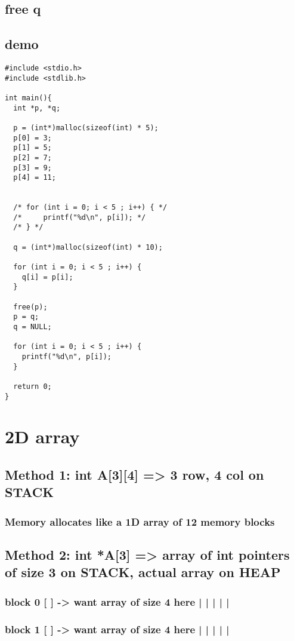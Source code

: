 \documentclass{article}
\begin{document}
\subsection{free q}
\label{sec:org4dbccab}
\subsection{demo}
\label{sec:org9976efd}
\begin{verbatim}
#include <stdio.h>
#include <stdlib.h>

int main(){
  int *p, *q;

  p = (int*)malloc(sizeof(int) * 5);
  p[0] = 3;
  p[1] = 5;
  p[2] = 7;
  p[3] = 9;
  p[4] = 11;


  /* for (int i = 0; i < 5 ; i++) { */
  /* 	 printf("%d\n", p[i]); */
  /* } */

  q = (int*)malloc(sizeof(int) * 10);

  for (int i = 0; i < 5 ; i++) {
    q[i] = p[i];
  }

  free(p);
  p = q;
  q = NULL;

  for (int i = 0; i < 5 ; i++) {
    printf("%d\n", p[i]);
  }

  return 0;
}

\end{verbatim}
\section{2D array}
\label{sec:org21454ca}
\subsection{Method 1: int A[3][4] => 3 row, 4 col on STACK}
\label{sec:orga17bfc5}
\subsubsection{Memory allocates like a 1D array of 12 memory blocks}
\label{sec:orgaba5ad2}
\subsection{Method 2: int *A[3] => array of int pointers of size 3 on STACK, actual array on HEAP}
\label{sec:org193f43b}
\subsubsection{block 0 [ ] -> want array of size 4 here | | | | |}
\label{sec:orga5e0cd8}
\subsubsection{block 1 [ ] -> want array of size 4 here | | | | |}
\label{sec:orgb2a7563}
\end{document}
